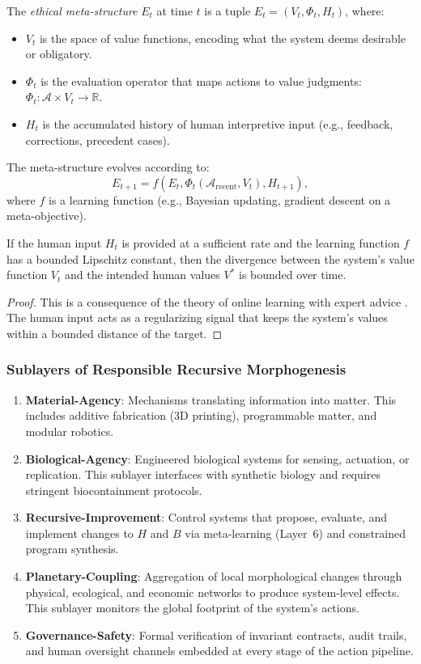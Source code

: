 \begin{definition}
The \emph{ethical meta-structure} $E_t$ at time $t$ is a tuple $E_t = (V_t, \Phi_t, H_t)$, where:
\begin{itemize}
    \item $V_t$ is the space of value functions, encoding what the system deems desirable or obligatory.
    \item $\Phi_t$ is the evaluation operator that maps actions to value judgments: $\Phi_t: \mathcal{A} \times V_t \to \mathbb{R}$.
    \item $H_t$ is the accumulated history of human interpretive input (e.g., feedback, corrections, precedent cases).
\end{itemize}
The meta-structure evolves according to:
\[
E_{t+1} = f(E_t, \Phi_t(\mathcal{A}_{\text{recent}}, V_t), H_{t+1}),
\]
where $f$ is a learning function (e.g., Bayesian updating, gradient descent on a meta-objective).
\end{definition}

\begin{proposition}
If the human input $H_t$ is provided at a sufficient rate and the learning function $f$ has a bounded Lipschitz constant, then the divergence between the system's value function $V_t$ and the intended human values $V^*$ is bounded over time.
\end{proposition}
\begin{proof}
This is a consequence of the theory of online learning with expert advice \cite{cesa2006prediction}. The human input acts as a regularizing signal that keeps the system's values within a bounded distance of the target.
\end{proof}

\subsubsection{Sublayers of Responsible Recursive Morphogenesis}
\begin{enumerate}
    \item \textbf{Material-Agency}: Mechanisms translating information into matter. This includes additive fabrication (3D printing), programmable matter, and modular robotics.
    \item \textbf{Biological-Agency}: Engineered biological systems for sensing, actuation, or replication. This sublayer interfaces with synthetic biology and requires stringent biocontainment protocols.
    \item \textbf{Recursive-Improvement}: Control systems that propose, evaluate, and implement changes to $H$ and $B$ via meta-learning (Layer~6) and constrained program synthesis.
    \item \textbf{Planetary-Coupling}: Aggregation of local morphological changes through physical, ecological, and economic networks to produce system-level effects. This sublayer monitors the global footprint of the system's actions.
    \item \textbf{Governance-Safety}: Formal verification of invariant contracts, audit trails, and human oversight channels embedded at every stage of the action pipeline.
\end{enumerate}

